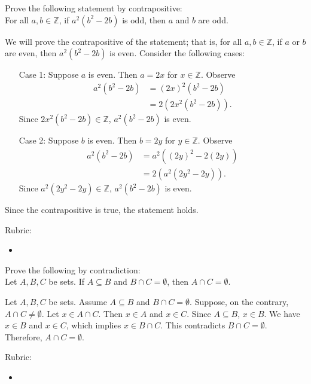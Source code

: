 \documentclass{article}
\newcommand{\Z}{\mathbb{Z}}
\theoremstyle{definition}
\begin{document}
\begin{question}{5}
    Prove the following statement by contrapositive: \\
    For all $a, b\in \mathbb{Z}$, if $a^2(b^2-2b)$ is odd, then $a$ and $b$ are odd.
\end{question}
\begin{solution}
We will prove the contrapositive of the statement; that is, for all $a, b\in \mathbb{Z}$, if $a$ or $b$ are even, then $a^2(b^2-2b)$ is even. Consider the following cases:
\begin{itemize}
\item[Case 1:] Suppose $a$ is even. Then $a=2x$ for $x\in\Z$. Observe
\begin{align*}
a^2(b^2-2b) & = (2x)^2 (b^2-2b)\\
& = 2(2x^2(b^2-2b)).
\end{align*}
Since $2x^2(b^2-2b)\in\Z$, $a^2(b^2-2b)$ is even.
\item[Case 2:] Suppose $b$ is even. Then $b=2y$ for $y\in\Z$. Observe
\begin{align*}
a^2(b^2-2b) & = a^2 ((2y)^2-2(2y))\\
& = 2(a^2(2y^2-2y)).
\end{align*}
Since $a^2(2y^2-2y)\in\Z$, $a^2(b^2-2b)$ is even.
\end{itemize}
Since the contrapositive is true, the statement holds.

{\color{red} Rubric:
\begin{itemize}
\item 
\end{itemize}}
\end{solution}


\begin{question}{5}
    Prove the following by contradiction:\\
    Let $A, B, C$ be sets. If $A\subseteq B$ and $B\cap C=\emptyset$, then $A\cap C=\emptyset$.
\end{question}
\begin{solution}
      Let $A, B, C$ be sets. Assume $A\subseteq B$ and $B\cap C=\emptyset$. Suppose, on the contrary, $A\cap C\neq\emptyset$. Let $x\in A\cap C$. Then $x\in A$ and $x\in C$. Since $A\subseteq B$, $x\in B$. We have $x\in B$ and $x\in C$, which implies $x \in B\cap C$. This contradicts $B\cap C=\emptyset$. Therefore, $A\cap C=\emptyset$.
	
{\color{red} Rubric:
\begin{itemize}
\item 
\end{itemize}}
\end{solution}
\end{document}

